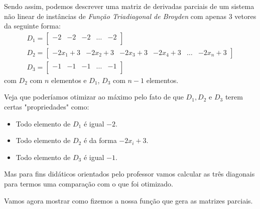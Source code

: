 \documentclass[10pt,a4paper]{article}
\begin{document}
	Sendo assim, podemos descrever uma matriz de derivadas parciais de um sistema não linear de instâncias de \textit{Função Triadiagonal de Broyden} com apenas $ 3 $ vetores da seguinte forma: 
	\begin{align*}
		& D_{1} = 
		\begin{bmatrix}
		-2 & -2  & -2 & \ldots & -2 \\
		\end{bmatrix} & \\
		& D_{2} = 
		\begin{bmatrix}
		-2x_{1} + 3 & - 2x_{2} + 3 & - 2x_{3} + 3 & - 2x_{4} + 3 & \ldots & - 2x_{n} + 3 
		\end{bmatrix} & \\
		& D_{3} = 
		\begin{bmatrix}
		-1 & -1  & -1 & \ldots & -1 \\
		\end{bmatrix} & 
	\end{align*}
	com $ D_{2} $ com $ n $ elementos e $ D_{1} $, $ D_{3} $ com $ n - 1 $ elementos.
	
	Veja que poderíamos otimizar ao máximo pelo fato de que $ D_{1}, D_{2} $ e $ D_{3} $ terem certas "propriedades" como:
	\begin{itemize}
		\item Todo elemento de $ D_{1} $ é igual $ -2 $.
		\item Todo elemento de $ D_{2} $ é da forma $ -2x_{i} + 3 $.
		\item Todo elemento de $ D_{3} $ é igual $ -1 $.
	\end{itemize}

	Mas para fins didáticos orientados pelo professor vamos calcular as três diagonais para termos uma comparação com o que foi otimizado.
	
	Vamos agora mostrar como fizemos a nossa função que gera as matrizes parciais.
\end{document}

